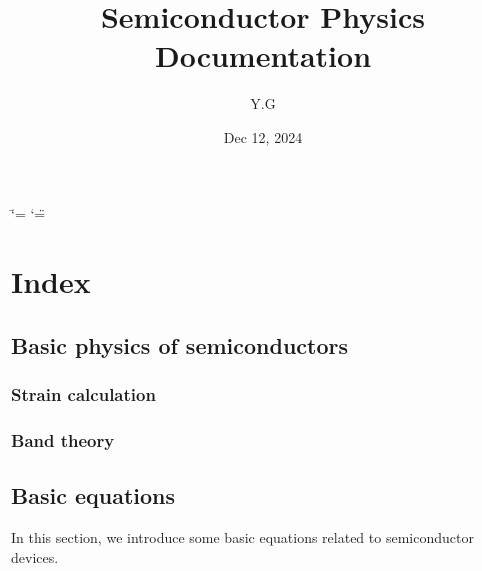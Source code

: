 \documentclass[letterpaper,10pt,english]{sphinxmanual}
\title{Semiconductor Physics Documentation}
\date{Dec 12, 2024}
\author{Y.G}
\numberwithin{equation}{section}
\begin{document}
\ifdefined\shorthandoff
  \ifnum\catcode`\=\string=\active\shorthandoff{=}\fi
  \ifnum\catcode`\"=\active{}\fi
\fi

\pagestyle{empty}
\sphinxmaketitle
\pagestyle{plain}
\sphinxtableofcontents
\pagestyle{normal}
\label{\detokenize{index::doc}}



\chapter{Index}
\label{\detokenize{index:index}}
\sphinxstepscope


\section{Basic physics of semiconductors}
\label{\detokenize{Basic_physics_of_semiconductors:basic-physics-of-semiconductors}}\label{\detokenize{Basic_physics_of_semiconductors::doc}}
\sphinxstepscope


\subsection{Strain calculation}
\label{\detokenize{strain_calculation:strain-calculation}}\label{\detokenize{strain_calculation::doc}}
\sphinxstepscope


\subsection{Band theory}
\label{\detokenize{band_theory:band-theory}}\label{\detokenize{band_theory::doc}}
\sphinxstepscope


\section{Basic equations}
\label{\detokenize{Basic_equation:basic-equations}}\label{\detokenize{Basic_equation::doc}}
\sphinxAtStartPar
In this section, we introduce some basic equations related to semiconductor devices.
\end{document}
